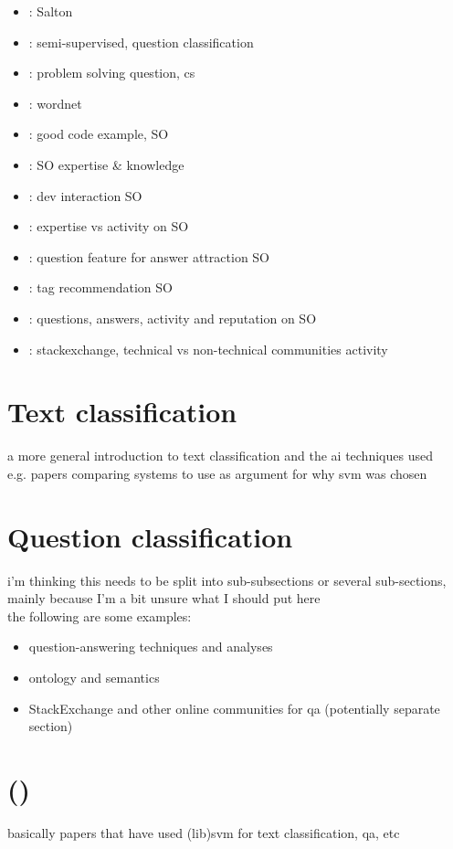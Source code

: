 \begin{itemize}
	\item \cite{Dubin2004}: Salton	
	\item \cite{NguyenNguyenShimazu2008}: semi-supervised, question classification
	\item \cite{RagonisShilo2013}: problem solving question, cs
	\item \cite{Miller1995}: wordnet	
	\item \cite{NasehiSillitoMaurerEtAl2012}: good code example, SO
	\item \cite{HanrahanConvertinoNelson2012}: SO expertise \& knowledge
	\item \cite{WangLoJiang2013}: dev interaction SO
	\item \cite{YangTaoBozzonEtAl2014}: expertise vs activity on SO
	\item \cite{ChengSchiffWu2013}: question feature for answer attraction SO
	\item \cite{ShortWongZeng2014}: tag recommendation SO
	\item \cite{PosnettWarburgDevanbuEtAl2012}: questions, answers, activity and reputation on SO
	\item \cite{AhmedYangJohri2015}: stackexchange, technical vs non-technical communities activity
\end{itemize}

\section{Text classification}
\label{sec:text_classification}
a more general introduction to text classification and the \gls{ai} techniques used \\
e.g. papers comparing systems to use as argument for why svm was chosen

\section{Question classification}
\label{sec:question_answering}
i'm thinking this needs to be split into sub-subsections or several sub-sections, mainly because I'm a bit unsure what I should put here \\
the following are some examples: 
\begin{itemize}
	\item question-answering techniques and analyses
	\item ontology and semantics
	\item StackExchange and other online communities for qa (potentially separate section)
\end{itemize}

\section{ ()}
\label{sec:svm}
basically papers that have used (lib)svm for text classification, qa, etc

